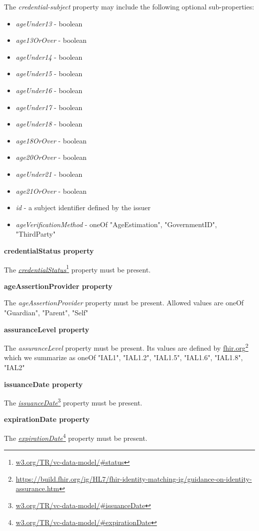 \documentclass[11pt, oneside]{article}   	%
\newcommand{\hyperfootnote}[1][]{\def\ArgI{{#1}}\hyperfootnoteRelay}
\newcommand\hyperfootnoteRelay[2][]{\href{#1#2}{\ArgI}\footnote{\href{#1#2}{#2}}}
\begin{document}
The \emph{credential-subject} property may include the following optional sub-properties:
\begin{itemize}
	\item \emph{ageUnder13} - boolean
	\item \emph{age13OrOver} - boolean
	\item \emph{ageUnder14} - boolean
	\item \emph{ageUnder15} - boolean
	\item \emph{ageUnder16} - boolean
	\item \emph{ageUnder17} - boolean
	\item \emph{ageUnder18} - boolean
	\item \emph{age18OrOver} - boolean
	\item \emph{age20OrOver} - boolean
	\item \emph{ageUnder21} - boolean
	\item \emph{age21OrOver} - boolean
	\item \emph{id} - a subject identifier defined by the issuer
	\item \emph{ageVerificationMethod} - oneOf {"AgeEstimation", "GovernmentID", "ThirdParty"}
\end{itemize}

\textbf{credentialStatus property}

The \hyperfootnote[\emph{credentialStatus}][https://]{w3.org/TR/vc-data-model/\#status} property must be present.

\textbf{ageAssertionProvider property}

The \emph{ageAssertionProvider} property must be present. Allowed values are oneOf {"Guardian", "Parent", "Self"}

\textbf{assuranceLevel property}

The \emph{assuranceLevel} property must be present. Its values are defined by \hyperfootnote[fhir.org][https://]{https://build.fhir.org/ig/HL7/fhir-identity-matching-ig/guidance-on-identity-assurance.htm} which we summarize as oneOf {"IAL1", "IAL1.2", "IAL1.5", "IAL1.6", "IAL1.8", "IAL2"}

\textbf{issuanceDate property}

The \hyperfootnote[\emph{issuanceDate}][https://]{w3.org/TR/vc-data-model/\#issuanceDate} property must be present.

\textbf{expirationDate property}

The \hyperfootnote[\emph{expirationDate}][https://]{w3.org/TR/vc-data-model/\#expirationDate} property must be present.
\end{document}
